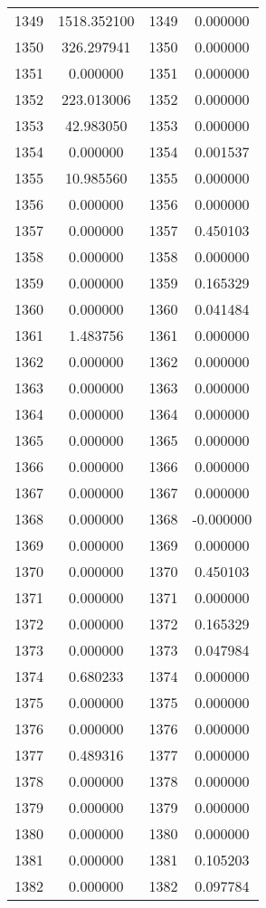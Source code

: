 \documentclass[12pt]{article}
\begin{document}
\begin{longtable}{@{}cccc@{}}
1349 & 1518.352100 & 1349 & 0.000000 \\
1350 & 326.297941 & 1350 & 0.000000 \\
1351 & 0.000000 & 1351 & 0.000000 \\
1352 & 223.013006 & 1352 & 0.000000 \\
1353 & 42.983050 & 1353 & 0.000000 \\
1354 & 0.000000 & 1354 & 0.001537 \\
1355 & 10.985560 & 1355 & 0.000000 \\
1356 & 0.000000 & 1356 & 0.000000 \\
1357 & 0.000000 & 1357 & 0.450103 \\
1358 & 0.000000 & 1358 & 0.000000 \\
1359 & 0.000000 & 1359 & 0.165329 \\
1360 & 0.000000 & 1360 & 0.041484 \\
1361 & 1.483756 & 1361 & 0.000000 \\
1362 & 0.000000 & 1362 & 0.000000 \\
1363 & 0.000000 & 1363 & 0.000000 \\
1364 & 0.000000 & 1364 & 0.000000 \\
1365 & 0.000000 & 1365 & 0.000000 \\
1366 & 0.000000 & 1366 & 0.000000 \\
1367 & 0.000000 & 1367 & 0.000000 \\
1368 & 0.000000 & 1368 & -0.000000 \\
1369 & 0.000000 & 1369 & 0.000000 \\
1370 & 0.000000 & 1370 & 0.450103 \\
1371 & 0.000000 & 1371 & 0.000000 \\
1372 & 0.000000 & 1372 & 0.165329 \\
1373 & 0.000000 & 1373 & 0.047984 \\
1374 & 0.680233 & 1374 & 0.000000 \\
1375 & 0.000000 & 1375 & 0.000000 \\
1376 & 0.000000 & 1376 & 0.000000 \\
1377 & 0.489316 & 1377 & 0.000000 \\
1378 & 0.000000 & 1378 & 0.000000 \\
1379 & 0.000000 & 1379 & 0.000000 \\
1380 & 0.000000 & 1380 & 0.000000 \\
1381 & 0.000000 & 1381 & 0.105203 \\
1382 & 0.000000 & 1382 & 0.097784 \\

\end{longtable}
\end{document}
